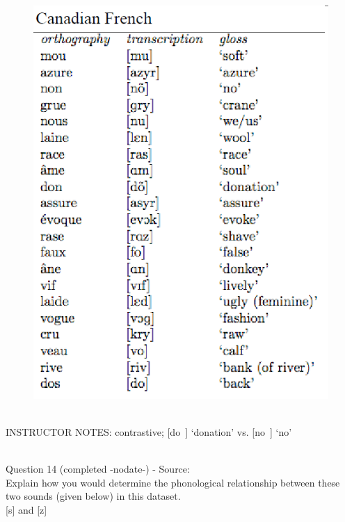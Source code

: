 \documentclass[12pt]{article}
\begin{document}
\begin{figure}[H]
\includegraphics{../images/canadianfrench.png}
\end{figure}

~\\
INSTRUCTOR NOTES: contrastive; [do~] ‘donation’ vs. [no~] ‘no’


~\\

{\large Question 14} (completed -nodate-) - Source: \\

Explain how you would determine the phonological relationship between these two sounds (given below) in this dataset.\\

{[s]} and {[z]}
\end{document}
